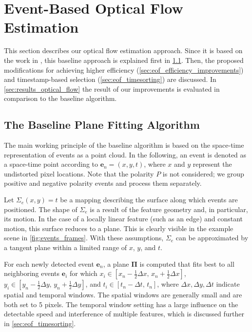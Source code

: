 \section{Event-Based Optical Flow Estimation}
\label{sec:eof_estimation}

This section describes our optical flow estimation approach. Since it is based on the work in \citet{Benosman2014}, this baseline approach is explained first in \cref{sec:eof_plane_fitting}. Then, the proposed modifications for achieving higher efficiency (\cref{sec:eof_efficiency_improvements}) and timestamp-based selection (\cref{sec:eof_timesorting}) are discussed. In \cref{sec:results_optical_flow} the result of our improvements is evaluated in comparison to the baseline algorithm.

\subsection{The Baseline Plane Fitting Algorithm}
\label{sec:eof_plane_fitting}
The main working principle of the baseline algorithm is based on the space-time representation of events as a point cloud. In the following, an event is denoted as a space-time point according to $\mathbf{e}_n=\left(x,y,t\right)$, where $x$ and $y$ represent the undistorted pixel locations. Note that the polarity $P$ is not considered; we group positive and negative polarity events and process them separately.

Let $\Sigma_e (x,y) = t$ be a mapping describing the surface along which events are positioned. The shape of $\Sigma_e$ is a result of the feature geometry and, in particular, its motion. In the case of a locally linear feature (such as an edge) and constant motion, this surface reduces to a plane. This is clearly visible in the example scene in \cref{fig:events_frames}. With these assumptions, $\Sigma_e$ can be approximated by a tangent plane within a limited range of $x$, $y$, and $t$.

For each newly detected event $\mathbf{e}_n$, a plane $\mathbf{\Pi}$ is computed that fits best to all neighboring events $\mathbf{e}_i$ for which $x_i \in \left[x_n-\frac{1}{2}\Delta x,\, x_n+\frac{1}{2}\Delta x\right]$, $y_i \in \left[y_n-\frac{1}{2}\Delta y,\, y_n+\frac{1}{2}\Delta y\right]$, and $t_i \in \left[t_n-\Delta t,\, t_n\right]$, where $\Delta x, \Delta y, \Delta t$ indicate spatial and temporal windows. The spatial windows are generally small and are both set to 5 pixels. The temporal window setting has a large influence on the detectable speed and interference of multiple features, which is discussed further in \cref{sec:eof_timesorting}. 

